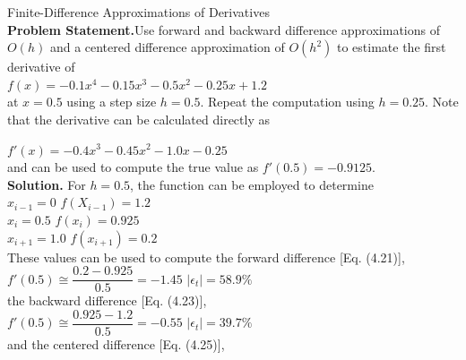 \documentclass[../main.tex]{subfiles}
\begin{document}
\begin{example} Finite-Difference Approximations of Derivatives\\

    \noindent\textbf{Problem Statement.}\quad Use forward and backward difference approximations of $O(h)$ and
    a centered difference approximation of $O(h^2)$ to estimate the first derivative of\\

    $f(x) = -0.1x^4 - 0.15x^3 - 0.5x^2 - 0.25x + 1.2$\\

    \noindent
    at $x = 0.5$ using a step size $h = 0.5$. Repeat the computation using $h = 0.25$. Note that the
    derivative can be calculated directly as

    $f'(x) = -0.4x^3 - 0.45x^2 - 1.0x - 0.25$\\

    \noindent
    and can be used to compute the true value as $f'(0.5) = -0.9125$.\\

    \noindent
    \textbf{Solution.} \quad For $h = 0.5$, the function can be employed to determine\\

    $x_{i-1}=0$\hspace{10mm} $f(X_{i-1})=1.2$\\

    $x_i=0.5$ \hspace{9.8mm} $f(x_i) = 0.925$\\

    $x_{i+1}=1.0$\hspace{7.6mm} $f(x_{i+1}) = 0.2$\\

    \noindent
    These values can be used to compute the forward difference [Eq. (4.21)],\\

    $f'(0.5)\cong\dfrac{0.2-0.925}{0.5}=-1.45$\hspace{10mm} $\left\lvert\epsilon_t \right\rvert = 58.9\%$\\

    \noindent
    the backward difference [Eq. (4.23)],\\

    $f'(0.5)\cong\dfrac{0.925-1.2}{0.5}=-0.55$\hspace{10mm} $\left\lvert\epsilon_t \right\rvert = 39.7\%$\\

    \noindent
    and the centered difference [Eq. (4.25)],\\


\end{example}
\end{document}
